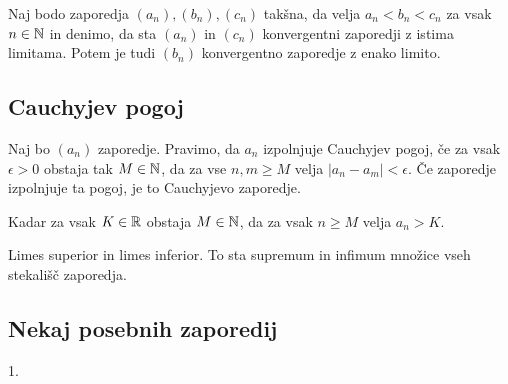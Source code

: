 Naj bodo zaporedja $(a_n), (b_n), (c_n)$ takšna, da velja $a_n < b_n < c_n$ za vsak $n \in \mathbb{N}$ in denimo, da sta $(a_n)$ in $(c_n)$ konvergentni zaporedji z istima limitama. Potem je tudi $(b_n)$ konvergentno zaporedje z enako limito.

\subsection{Cauchyjev pogoj}


Naj bo $(a_n)$ zaporedje. Pravimo, da $a_n$ izpolnjuje Cauchyjev pogoj, če za vsak $\epsilon>0$ obstaja tak $M\in\mathbb{N}$, da za vse $n,m\ge M$ velja $|a_n-a_m| < \epsilon$. Če zaporedje izpolnjuje ta pogoj, je to Cauchyjevo zaporedje.


Kadar za vsak $K \in \mathbb{R}$ obstaja $M \in \mathbb{N}$, da za vsak $n\ge M$ velja $a_n > K$.


Limes superior in limes inferior. To sta supremum in infimum množice vseh stekališč zaporedja.

\subsection{Nekaj posebnih zaporedij}


1. 